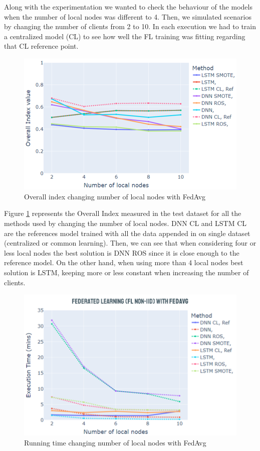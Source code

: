 Along with the experimentation we wanted to check the behaviour of the models when the number of local nodes was different to 4. Then, we simulated scenarios by changing the number of clients from 2 to 10. In each execution we had to train a centralized model (CL) to see how well the FL training was fitting regarding that CL reference point.

\begin{figure}[H]
\centering
\includegraphics[scale=0.6]{img/change_local_nodes_metrics_fedavg.png}
\caption{Overall index changing number of local nodes with FedAvg}
\label{fig:change_local_nodes_metrics_fedavg}
\end{figure}

Figure \ref{fig:change_local_nodes_metrics_fedavg} represents the Overall Index measured in the test dataset for all the methods used by changing the number of local nodes. DNN CL and LSTM CL are the references model trained with all the data appended in on single dataset (centralized or common learning). Then, we can see that when considering four or less local nodes the best solution is DNN ROS since it is close enough to the reference model. On the other hand, when using more than 4 local nodes best solution is LSTM, keeping more or less constant when increasing the number of clients.

\begin{figure}[H]
\centering
\includegraphics[scale=0.6]{img/change_local_nodes_time_fedavg.png}
\caption{Running time changing number of local nodes with FedAvg}
\label{fig:change_local_nodes_time_fedavg}
\end{figure}



